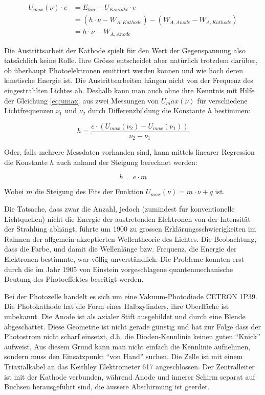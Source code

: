 \begin{align}
    U_{max}(\nu)\cdot e &= E_{kin} - U_{Kontakt} \cdot e \\
                        &= \left(h\cdot\nu - W_{A,Kathode}\right) - \left(W_{A,Anode}-W_{A,Kathode}\right) \\
                        &= h\cdot\nu - W_{A,Anode}
    \label{eq:umax}
\end{align}

Die Austrittsarbeit der Kathode spielt f\"ur den Wert  der  Gegenspannung also
tats\"achlich keine Rolle. Ihre Gr\"osse entscheidet aber nat\"urlich trotzdem
dar\"uber,  ob  \"uberhaupt  Photoelektronen emittiert werden k\"onnen und wie
hoch  deren kinetische Energie ist. Die Austrittsarbeiten h\"angen  nicht  von
der  Frequenz  des  eingestrahlten Lichtes ab. Deshalb kann man auch ohne ihre
Kenntnis  mit  Hilfe  der  Gleichung  \ref{eq:umax}  aus  zwei  Messungen  von
$U_max(\nu)$  f\"ur  verschiedene  Lichtfrequenzen  $\nu_1$  und $\nu_2$ durch
Differenzbildung die Konstante $h$ bestimmen:

\begin{equation}
    h = \frac{e\cdot\left(U_{max}(\nu_2) - U_{max}(\nu_1)\right)}{\nu_2 - \nu_1}
\end{equation}

Oder, falls mehrere Messdaten vorhanden sind, kann mittels linearer Regression
die Konstante $h$ auch anhand der Steigung berechnet werden:

\begin{equation}
    h = e \cdot m
    \label{eq:h}
\end{equation}

Wobei $m$ die Steigung des Fits der Funktion  $U_{max}(\nu)  =  m\cdot\nu + q$
ist.

Die  Tatsache,  dass  zwar  die  Anzahl, jedoch (zumindest fur  konventionelle
Lichtquellen)   nicht   die   Energie  der  austretenden  Elektronen  von  der
Intensit\"at  der   Strahlung   abh\"angt,   f\"uhrte   um   1900  zu  grossen
Erkl\"arungsschwierigkeiten im Rahmen der allgemein akzeptierten Wellentheorie
des Lichtes. Die Beobachtung, dass die Farbe, und damit die Wellenl\"ange bzw.
Frequenz, die Energie der Elektronen bestimmte, war v\"ollig unverst\"andlich.
Die Probleme konnten erst durch die im Jahr 1905 von  Einstein  vorgeschlagene
quantenmechanische Deutung des Photoeffektes beseitigt werden.

Bei der Photozelle handelt es sich um eine Vakuum-Photodiode CETRON  1P39. Die
Photokathode  hat  die   Form   eines  Halbzylinders,  ihre  Oberfl\"ache  ist
unbekannt. Die Anode ist als axialer Stift  ausgebildet  und durch eine Blende
abgeschattet.  Diese  Geometrie ist nicht gerade g\"unstig und hat  zur  Folge
dass  der  Photostrom nicht scharf einsetzt, d.h. die Dioden-Kennlinie  keinen
guten  ``Knick''  aufweist.  Aus  diesem  Grund  kann  man  nicht einfach  die
Kennlinie  aufnehmen,  sondern muss den Einsatzpunkt ``von Hand'' suchen.  Die
Zelle  ist  mit  einem  Triaxialkabel  an   das   Keithley   Elektrometer  617
angeschlossen.  Der  Zentralleiter ist mit der  Kathode  verbunden,  w\"ahrend
Anode  und  innerer  Schirm  separat  auf Buchsen  herausgef\"uhrt  sind,  die
\"aussere Abschirmung ist geerdet.

